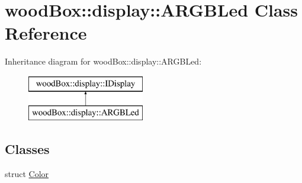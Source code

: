 \hypertarget{classwood_box_1_1display_1_1_a_r_g_b_led}{}\section{wood\+Box\+:\+:display\+:\+:A\+R\+G\+B\+Led Class Reference}
\label{classwood_box_1_1display_1_1_a_r_g_b_led}
Inheritance diagram for wood\+Box\+:\+:display\+:\+:A\+R\+G\+B\+Led\+:\begin{figure}[H]
\begin{center}
\leavevmode
\includegraphics[height=2.000000cm]{classwood_box_1_1display_1_1_a_r_g_b_led}
\end{center}
\end{figure}
\subsection*{Classes}
\begin{DoxyCompactItemize}
\item 
struct \mbox{\hyperlink{structwood_box_1_1display_1_1_a_r_g_b_led_1_1_color}{Color}}
\end{DoxyCompactItemize}
